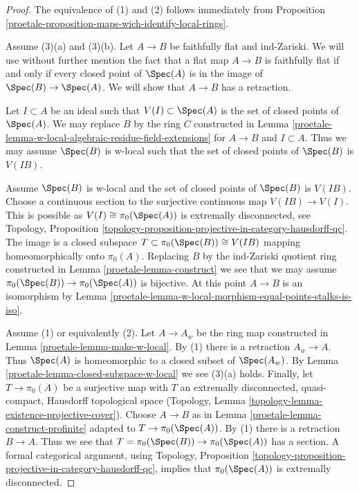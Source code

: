 \begin{proof}

The equivalence of (1) and (2) follows immediately from
Proposition \ref{proetale-proposition-maps-wich-identify-local-rings}.

\medskip\noindent
Assume (3)(a) and (3)(b). Let $A \to B$ be faithfully flat and ind-Zariski.
We will use without further mention the fact that a flat map
$A \to B$ is faithfully flat if and only if every closed point
of $\Spec(A)$ is in the image of $\Spec(B) \to \Spec(A)$.
We will show that $A \to B$ has a retraction.

\medskip\noindent
Let $I \subset A$ be an ideal such that $V(I) \subset \Spec(A)$ is
the set of closed points of $\Spec(A)$.
We may replace $B$ by the ring $C$ constructed in
Lemma \ref{proetale-lemma-w-local-algebraic-residue-field-extensions}
for $A \to B$ and $I \subset A$.
Thus we may assume $\Spec(B)$ is w-local such that the set of
closed points of $\Spec(B)$ is $V(IB)$.

\medskip\noindent
Assume $\Spec(B)$ is w-local and the set of closed points of $\Spec(B)$
is $V(IB)$. Choose a continuous section to the surjective
continuous map $V(IB) \to V(I)$. This is possible as
$V(I) \cong \pi_0(\Spec(A))$ is extremally disconnected, see
Topology, Proposition
\ref{topology-proposition-projective-in-category-hausdorff-qc}.
The image is a closed subspace $T \subset \pi_0(\Spec(B)) \cong V(IB)$
mapping homeomorphically onto $\pi_0(A)$. Replacing $B$ by the ind-Zariski
quotient ring constructed in Lemma \ref{proetale-lemma-construct}
we see that we may assume $\pi_0(\Spec(B)) \to \pi_0(\Spec(A))$
is bijective. At this point $A \to B$ is an isomorphism by
Lemma \ref{proetale-lemma-w-local-morphism-equal-points-stalks-is-iso}.

\medskip\noindent
Assume (1) or equivalently (2). Let $A \to A_w$ be the ring map constructed in
Lemma \ref{proetale-lemma-make-w-local}. By (1) there is a retraction $A_w \to A$.
Thus $\Spec(A)$ is homeomorphic to a closed subset of $\Spec(A_w)$. By
Lemma \ref{proetale-lemma-closed-subspace-w-local} we see (3)(a) holds.
Finally, let $T \to \pi_0(A)$ be a surjective map with $T$ an
extremally disconnected, quasi-compact, Hausdorff topological space
(Topology, Lemma \ref{topology-lemma-existence-projective-cover}).
Choose $A \to B$ as in Lemma \ref{proetale-lemma-construct-profinite}
adapted to $T \to \pi_0(\Spec(A))$. By (1) there is a retraction
$B \to A$. Thus we see that $T = \pi_0(\Spec(B)) \to \pi_0(\Spec(A))$
has a section. A formal categorical argument, using
Topology, Proposition
\ref{topology-proposition-projective-in-category-hausdorff-qc},
implies that $\pi_0(\Spec(A))$ is extremally disconnected.
\end{proof}

